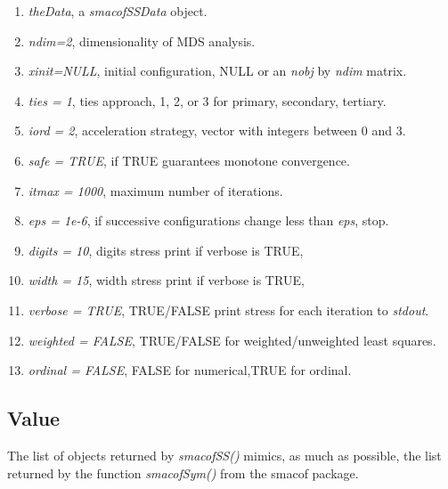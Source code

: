 \documentclass[
  12pt,
  letterpaper,
  DIV=11,
  numbers=noendperiod]{scrartcl}
\providecommand{\tightlist}{%
  \setlength{\itemsep}{0pt}\setlength{\parskip}{0pt}}
\begin{document}
\begin{enumerate}
\def\labelenumi{\arabic{enumi}.}
\tightlist
\item
  \emph{theData}, a \emph{smacofSSData} object.
\item
  \emph{ndim=2}, dimensionality of MDS analysis.
\item
  \emph{xinit=NULL}, initial configuration, NULL or an \emph{nobj} by
  \emph{ndim} matrix.
\item
  \emph{ties = 1}, ties approach, 1, 2, or 3 for primary, secondary,
  tertiary.
\item
  \emph{iord = 2}, acceleration strategy, vector with integers between 0
  and 3.
\item
  \emph{safe = TRUE}, if TRUE guarantees monotone convergence.
\item
  \emph{itmax = 1000}, maximum number of iterations.
\item
  \emph{eps = 1e-6}, if successive configurations change less than
  \emph{eps}, stop.
\item
  \emph{digits = 10}, digits stress print if verbose is TRUE,
\item
  \emph{width = 15}, width stress print if verbose is TRUE,
\item
  \emph{verbose = TRUE}, TRUE/FALSE print stress for each iteration to
  \emph{stdout}.
\item
  \emph{weighted = FALSE}, TRUE/FALSE for weighted/unweighted least
  squares.
\item
  \emph{ordinal = FALSE}, FALSE for numerical,TRUE for ordinal.
\end{enumerate}

\subsection{Value}\label{value}

The list of objects returned by \emph{smacofSS()} mimics, as much as
possible, the list returned by the function \emph{smacofSym()} from the
smacof package.
\end{document}
